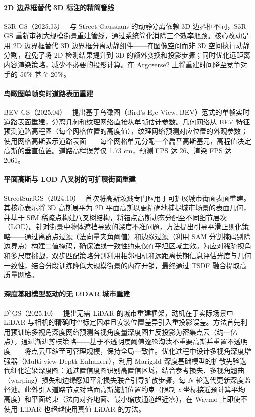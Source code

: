 \paragraph{2D 边界框替代 3D 标注的精简管线}

S3R-GS（2025.03）~\cite{2503_08217} 与 Street Gaussians 的动静分离依赖 3D 边界框不同，S3R-GS 重新审视大规模街景重建管线，通过系统简化消除三个效率瓶颈。核心改动是用 2D 边界框替代 3D 边界框分离动静组件——在图像空间而非 3D 空间执行动静分割，避免了将 2D 检测结果提升到 3D 的额外变换和投影步骤；同时优化远距离内容渲染策略，减少不必要的投影计算。在 Argoverse2 上将重建时间降至竞争对手的 50\% 甚至 20\%。

\paragraph{鸟瞰图单帧实时道路表面重建}

BEV-GS（2025.04）~\cite{2504_13207} 提出基于鸟瞰图（Bird's Eye View, BEV）范式的单帧实时道路表面重建，分离几何和纹理网络直接从单帧估计参数。几何网络从 BEV 特征预测道路高程图（每个网格位置的高度值），纹理网络预测对应位置的外观参数；使用网格高斯表示道路表面——每个网格单元分配一个扁平高斯基元，高程值决定高斯的垂直位置。道路高程误差仅 1.73 cm，预测 FPS 达 26、渲染 FPS 达 2061。

\paragraph{平面高斯与 LOD 八叉树的可扩展街面重建}

StreetSurfGS（2024.10）~\cite{2410_04354} 首次将高斯泼溅专门应用于可扩展城市街面表面重建。其核心表示将 3D 高斯展平为 2D 平面高斯以更精确地捕捉城市场景的表面几何，并基于 SfM 稀疏点构建八叉树结构，将锚点高斯动态分配至不同细节层次（LOD）。针对街景中物体遮挡导致的深度不准问题，方法提出引导平滑正则化策略——通过离群点过滤（法向量夹角阈值）和边缘过滤（利用 SAM 分割掩码剔除边界点）构建二值掩码，确保法线一致性约束仅在平坦区域生效。为应对稀疏视角和多尺度挑战，双步匹配策略分别利用相邻相机和远距离长期信息评估光度与几何一致性，结合分段训练降低大规模街景的内存开销，最终通过 TSDF 融合提取高质量网格。

\paragraph{深度基础模型驱动的无 LiDAR 城市重建}

D$^2$GS（2025.10）~\cite{2510_25173} 提出无需 LiDAR 的城市重建框架，动机在于实际场景中 LiDAR 与相机的精确时空标定困难且安装位置差异引入重投影误差。方法首先利用预训练多视角深度网络预测各视角度量深度图并反投影为密集点云（约一亿点），通过渐进剪枝策略——基于不透明度阈值逐轮淘汰不重要高斯并重置不透明度——将点云压缩至可管理规模，保持全局一致性。优化过程中设计多视角深度增强器（Multi-view Depth Enhancer），利用 Marigold 深度基础模型的扩散先验迭代细化渲染深度图：通过置信度图识别高置信区域，结合参考损失、多视角翘曲（warping）损失和边缘感知平滑损失联合引导扩散步骤，每 $N$ 轮迭代更新深度监督池。此外引入道路节点对路面高斯施加位置约束（限制 $z$ 坐标接近预计算平均高度）和平面约束（法向对齐地面、最小缩放通道趋近零），在 Waymo 上即使不使用 LiDAR 也超越使用真值 LiDAR 的方法。

